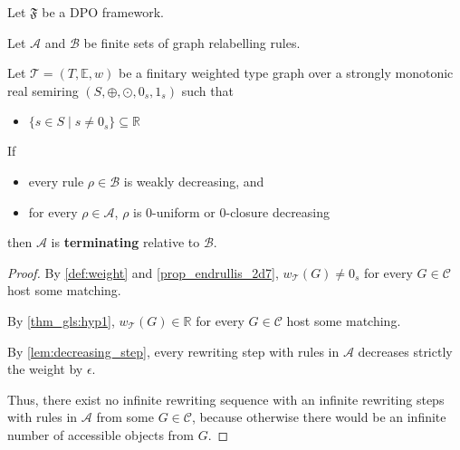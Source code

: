 \begin{theorem} 
  \label{thm:termination_gls}
  Let $\mathfrak{F}$ be a DPO framework.
  
  Let $\mathcal{A}$ and $\mathcal{B}$ be finite sets of graph relabelling rules.
  
  Let $\mathcal{T} = (T,\mathbb{E}, w)$ be a finitary weighted type graph over a strongly monotonic real semiring \( (S, \oplus, \odot, 0_s, 1_s)\) such that 
  \begin{itemize}
       \item\label{thm_gls:hyp1} $\{s \in S\mid s \neq 0_s\} \subseteq \mathbb{R}$
  \end{itemize}

  If  
  \begin{itemize}
  \item every rule $\rho \in \mathcal{B}$ is weakly decreasing, and
  \item for every $\rho \in \mathcal{A}$, $\rho$ is $0$-uniform or $0$-closure decreasing 
  \end{itemize}
  then $\mathcal{A }$ is \textbf{terminating} relative to $\mathcal{B }$.
\end{theorem}

\begin{proof}
  By \autoref{def:weight} and \autoref{prop_endrullis_2d7}, $w_\mathcal{T}(G) \neq 0_s$ for every $G \in \mathcal{C}$ host some matching.

  By \ref{thm_gls:hyp1}, $w_\mathcal{T}(G) \in \mathbb{R}$ for every $G \in \mathcal{C}$ host some matching.

  By \autoref{lem:decreasing_step}, every rewriting step with rules in $\mathcal{A}$ decreases strictly the weight by $\epsilon$.

  Thus, there exist no infinite rewriting sequence with an infinite rewriting steps with rules in $\mathcal{A}$ from some $G \in \mathcal{C}$, because otherwise there would be an infinite number of accessible objects from $G$.
\end{proof}
